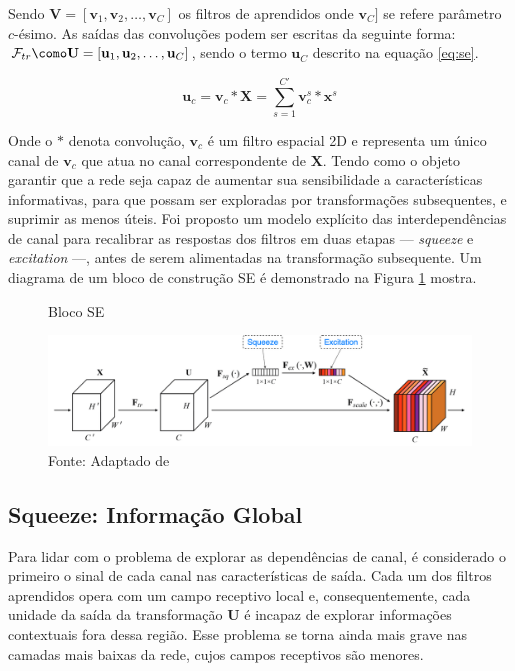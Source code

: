 Sendo $\mathbf{V} = [\mathbf{v}_1, \mathbf{v}_2, \ldots, \mathbf{v}_C]$ os filtros de aprendidos onde $\mathbf{v}_C]$ se refere parâmetro $c$-ésimo. As saídas das convoluções podem ser escritas da seguinte forma: $\mathcal{F}_{tr} \como \mathbf{U} = [\mathbf{u}_1, \mathbf{u}_2, \ldots, \mathbf{u}_C]$, sendo o termo $\mathbf{u}_C$ descrito na equação \ref{eq:se}. 

\begin{equation}
\mathbf{u}_c = \mathbf{v}_c \ast \mathbf{X} = \sum_{s=1}^{C'} \mathbf{v}_c^s \ast \mathbf{x}^s
\label{eq:se}
\end{equation}

Onde o $\ast$ denota convolução, $\mathbf{v}_c$ é um filtro espacial 2D e representa um único canal de $\mathbf{v}_c$ que atua no canal correspondente de $\mathbf{X}$. 
Tendo como o objeto garantir que a rede seja capaz de aumentar sua sensibilidade a características informativas, para que possam ser exploradas por transformações subsequentes, e suprimir as menos úteis. Foi proposto um modelo explícito das interdependências de canal para recalibrar as respostas dos filtros em duas etapas — \textit{squeeze} e \textit{excitation} —, antes de serem alimentadas na transformação subsequente. Um diagrama de um bloco de construção \gls{SE} é demonstrado na Figura \ref{fig:fig025} mostra.

\begin{figure}[h!]
    \caption{Bloco SE}
    \includegraphics[height=0.27\textwidth]{figures/fig025.png}
    \caption*{Fonte: Adaptado de \cite{huSqueezeandExcitationNetworks2018}}
    \label{fig:fig025}
\end{figure}


\subsection{Squeeze: Informação Global}
\label{subsec:squeeze}

Para lidar com o problema de explorar as dependências de canal, é considerado o primeiro o sinal de cada canal nas características de saída. Cada um dos filtros aprendidos opera com um campo receptivo local e, consequentemente, cada unidade da saída da transformação $\mathbf{U}$ é incapaz de explorar informações contextuais fora dessa região. Esse problema se torna ainda mais grave nas camadas mais baixas da rede, cujos campos receptivos são menores.

